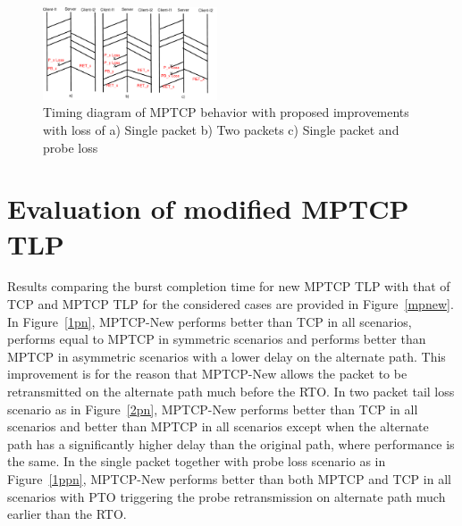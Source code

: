 \documentclass[10pt,conference,compsoc]{IEEEtran}
\begin{document}
\begin{figure}[!ht]
\begin{center}
\includegraphics[angle=0, width=0.46\textwidth]{images/timingER3NewTLP1.pdf}
\end{center}
\caption{Timing diagram of MPTCP behavior with proposed improvements with loss of a) Single packet b) Two packets c) Single packet and probe loss}\label{timingNew}
\end{figure}


\section{Evaluation of modified MPTCP TLP}\label{eval}


Results comparing the burst completion time for new MPTCP TLP with that of TCP and MPTCP TLP for the considered cases are provided in Figure~\ref{mpnew}. In Figure~\ref{1pn}, MPTCP-New performs better than TCP in all scenarios, performs equal to MPTCP in symmetric scenarios and performs better than MPTCP in asymmetric scenarios with a lower delay on the alternate path. This improvement is for the reason that MPTCP-New allows the packet to be retransmitted on the alternate path much before the RTO. In two packet tail loss scenario as in Figure~\ref{2pn}, MPTCP-New performs better than TCP in all scenarios and better than MPTCP in all scenarios except when the alternate path has a significantly higher delay than the original path, where performance is the same. In the single packet together with probe loss scenario as in Figure~\ref{1ppn}, MPTCP-New performs better than both MPTCP and TCP in all scenarios with PTO triggering the probe retransmission on alternate path much earlier than the RTO.
\end{document}
